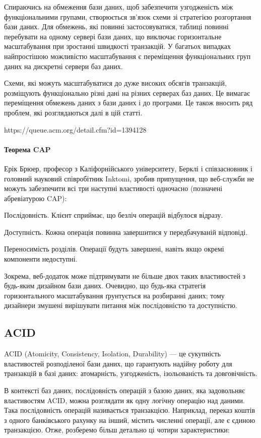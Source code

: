 \documentclass[14pt]{vakthesis}
\begin{document}
Спираючись на обмеження бази даних, щоб забезпечити узгодженість між функціональними групами, створюється зв'язок схеми зі стратегією розгортання бази даних. Для обмежень, які повинні застосовуватися, таблиці повинні перебувати на одному сервері бази даних, що виключає горизонтальне масштабування при зростанні швидкості транзакцій. У багатьох випадках найпростішою можливістю масштабування є переміщення функціональних груп даних на дискретні сервери баз даних.

Схеми, які можуть масштабуватися до дуже високих обсягів транзакцій, розміщують функціонально різні дані на різних серверах баз даних. Це вимагає переміщення обмежень даних з бази даних і до програми. Це також вносить ряд проблем, які розглядаються далі в цій статті.

https://queue.acm.org/detail.cfm?id=1394128
\paragraph{Теорема CAP}

Ерік Брюер, професор з Каліфорнійського університету, Берклі і співзасновник і головний науковий співробітник Inktomi, зробив припущення, що веб-служби не можуть забезпечити всі три наступні властивості одночасно (позначені абревіатурою CAP):

Послідовність. Клієнт сприймає, що безліч операцій відбулося відразу.

Доступність. Кожна операція повинна завершитися у передбачуваній відповіді.

Переносимість розділів. Операції будуть завершені, навіть якщо окремі компоненти недоступні.

Зокрема, веб-додаток може підтримувати не більше двох таких властивостей з будь-яким дизайном бази даних. Очевидно, що будь-яка стратегія горизонтального масштабування ґрунтується на розбиранні даних; тому дизайнери змушені вирішувати питання між послідовністю та доступністю.


\subsection{ACID}

ACID (Atomicity, Consistency, Isolation, Durability) — це сукупність властивостей розподіленої бази даних, що гарантують надійну роботу для транзакцій в базі даних: атомарність, узгодженість, ізольованість та довговічність. 

В контексті баз даних, послідовність операцій з базою даних, яка задовольняє властивостям ACID, можна розглядати як одну логічну операцію над даними. Така послідовність операцій називається транзакцією. Наприклад, переказ коштів з одного банківського рахунку на інший, містить численні операції, але є єдиною транзакцією. Отже, розберемо більш детально ці чотири характеристики:
\end{document}
